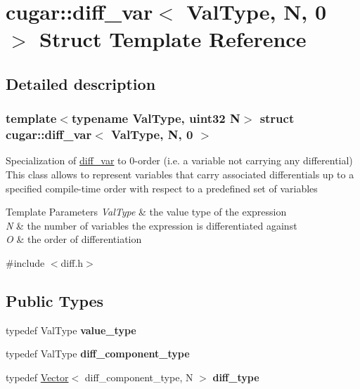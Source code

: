 \hypertarget{structcugar_1_1diff__var_3_01_val_type_00_01_n_00_010_01_4}{}\section{cugar\+:\+:diff\+\_\+var$<$ Val\+Type, N, 0 $>$ Struct Template Reference}
\label{structcugar_1_1diff__var_3_01_val_type_00_01_n_00_010_01_4}


\subsection{Detailed description}
\subsubsection*{template$<$typename Val\+Type, uint32 N$>$\newline
struct cugar\+::diff\+\_\+var$<$ Val\+Type, N, 0 $>$}

Specialization of \hyperlink{structcugar_1_1diff__var}{diff\+\_\+var} to 0-\/order (i.\+e. a variable not carrying any differential) This class allows to represent variables that carry associated differentials up to a specified compile-\/time order with respect to a predefined set of variables


\begin{DoxyTemplParams}{Template Parameters}
{\em Val\+Type} & the value type of the expression \\
\hline
{\em N} & the number of variables the expression is differentiated against \\
\hline
{\em O} & the order of differentiation \\
\hline
\end{DoxyTemplParams}


{\ttfamily \#include $<$diff.\+h$>$}

\subsection*{Public Types}
\begin{DoxyCompactItemize}
\item 
\mbox{\label{structcugar_1_1diff__var_3_01_val_type_00_01_n_00_010_01_4_aa65418a804c3ece94d3696339581c14e}} 
typedef Val\+Type {\bfseries value\+\_\+type}
\item 
\mbox{\label{structcugar_1_1diff__var_3_01_val_type_00_01_n_00_010_01_4_a4846aa859815e9e03925a5cdbb149d6b}} 
typedef Val\+Type {\bfseries diff\+\_\+component\+\_\+type}
\item 
\mbox{\label{structcugar_1_1diff__var_3_01_val_type_00_01_n_00_010_01_4_a168bca8cbedcbf8771a48e4ab2157b3d}} 
typedef \hyperlink{structcugar_1_1_vector}{Vector}$<$ diff\+\_\+component\+\_\+type, N $>$ {\bfseries diff\+\_\+type}
\end{DoxyCompactItemize}
